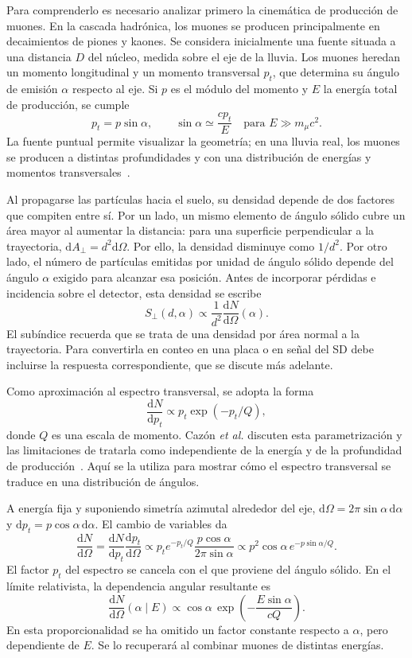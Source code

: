 Para comprenderlo es necesario analizar primero la cinemática de producción de muones. En la cascada hadrónica, los muones se producen principalmente en decaimientos de piones y kaones. Se considera inicialmente una fuente situada a una distancia $D$ del núcleo, medida sobre el eje de la lluvia. Los muones heredan un momento longitudinal y un momento transversal $p_t$, que determina su ángulo de emisión $\alpha$ respecto al eje. Si $p$ es el módulo del momento y $E$ la energía total de producción, se cumple
\[
p_t=p\sin\alpha,
\qquad
\sin\alpha\simeq\frac{cp_t}{E}
\quad\text{para }E\gg m_\mu c^2.
\]
La fuente puntual permite visualizar la geometría; en una lluvia real, los muones se producen a distintas profundidades y con una distribución de energías y momentos transversales~\cite{Cazon2012}.

Al propagarse las partículas hacia el suelo, su densidad depende de dos factores que compiten entre sí. Por un lado, un mismo elemento de ángulo sólido cubre un área mayor al aumentar la distancia: para una superficie perpendicular a la trayectoria, $\mathrm dA_\perp=d^2\mathrm d\Omega$. Por ello, la densidad disminuye como $1/d^2$. Por otro lado, el número de partículas emitidas por unidad de ángulo sólido depende del ángulo $\alpha$ exigido para alcanzar esa posición. Antes de incorporar pérdidas e incidencia sobre el detector, esta densidad se escribe
\begin{equation}
S_\perp(d,\alpha)\propto\frac{1}{d^2}\frac{\mathrm dN}{\mathrm d\Omega}(\alpha).
\label{eq:asym_a1_previa}
\end{equation}
El subíndice recuerda que se trata de una densidad por área normal a la trayectoria. Para convertirla en conteo en una placa o en señal del SD debe incluirse la respuesta correspondiente, que se discute más adelante.

Como aproximación al espectro transversal, se adopta la forma
\[
\frac{\mathrm dN}{\mathrm dp_t}\propto p_t\exp(-p_t/Q),
\]
donde $Q$ es una escala de momento. Cazón \textit{et al.} discuten esta parametrización y las limitaciones de tratarla como independiente de la energía y de la profundidad de producción~\cite[Sec.~2]{Cazon2012}. Aquí se la utiliza para mostrar cómo el espectro transversal se traduce en una distribución de ángulos.

A energía fija y suponiendo simetría azimutal alrededor del eje, $\mathrm d\Omega=2\pi\sin\alpha\,\mathrm d\alpha$ y $\mathrm dp_t=p\cos\alpha\,\mathrm d\alpha$. El cambio de variables da
\[
\frac{\mathrm dN}{\mathrm d\Omega}
=\frac{\mathrm dN}{\mathrm dp_t}\frac{\mathrm dp_t}{\mathrm d\Omega}
\propto p_t e^{-p_t/Q}\frac{p\cos\alpha}{2\pi\sin\alpha}
\propto p^2\cos\alpha\,e^{-p\sin\alpha/Q}.
\]
El factor $p_t$ del espectro se cancela con el que proviene del ángulo sólido. En el límite relativista, la dependencia angular resultante es
\begin{equation}
\frac{\mathrm dN}{\mathrm d\Omega}(\alpha\mid E)
\propto\cos\alpha\,\exp\!\left(-\frac{E\sin\alpha}{cQ}\right).
\label{eq:cazon_dNdOmega}
\end{equation}
En esta proporcionalidad se ha omitido un factor constante respecto a $\alpha$, pero dependiente de $E$. Se lo recuperará al combinar muones de distintas energías.


